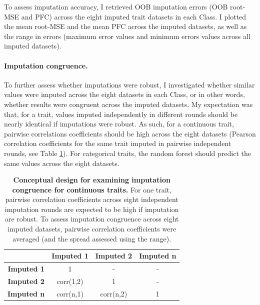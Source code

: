 To assess imputation accuracy, I retrieved OOB imputation errors (OOB root-MSE and PFC) across the eight imputed trait datasets in each Class. I plotted the mean root-MSE and the mean PFC across the imputed datasets, as well as the range in errors (maximum error values and minimum errors values across all imputed datasets).

\paragraph{Imputation congruence.} To further assess whether imputations were robust, I investigated whether similar values were imputed across the eight datasets in each Class, or in other words, whether results were congruent across the imputed datasets.  My expectation was that, for a trait, values imputed independently in different rounds should be nearly identical if imputations were robust. As such, for a continuous trait, pairwise correlations coefficients should be high across the eight datasets (Pearson correlation coefficients for the same trait imputed in pairwise independent rounds, see Table \ref{pairwisecorr}). For categorical traits, the random forest should predict the same values across the eight datasets. 

\begin{table}[h!]
\renewcommand{\baselinestretch}{1}
\renewcommand{\arraystretch}{1.5}
\begin{center}\fontsize{9}{11}\selectfont
\caption[Conceptual design for examining imputation congruence for continuous traits]{\textbf{Conceptual design for examining imputation congruence for continuous traits.} For one trait, pairwise correlation coefficients across eight independent imputation rounds are expected to be high if imputation are robust. To assess imputation congruence across eight imputed datasets, pairwise correlation coefficients were averaged (and the spread assessed using the range).} 
\label{pairwisecorr}
 \begin{tabular}{c|c|c|c|}
\cline{2-4}
\multicolumn{1}{l|}{}                    & \textbf{Imputed 1} & \textbf{Imputed 2} & \textbf{Imputed n} \\ \hline
\multicolumn{1}{|c|}{\textbf{Imputed 1}} & 1                  & -                  & -                  \\ \hline
\multicolumn{1}{|c|}{\textbf{Imputed 2}} & corr(1,2)          & 1                  & -                  \\ \hline
\multicolumn{1}{|c|}{\textbf{Imputed n}} & corr(n,1)          & corr(n,2)          & 1                  \\ \hline
\end{tabular}
\end{center}
\end{table}


